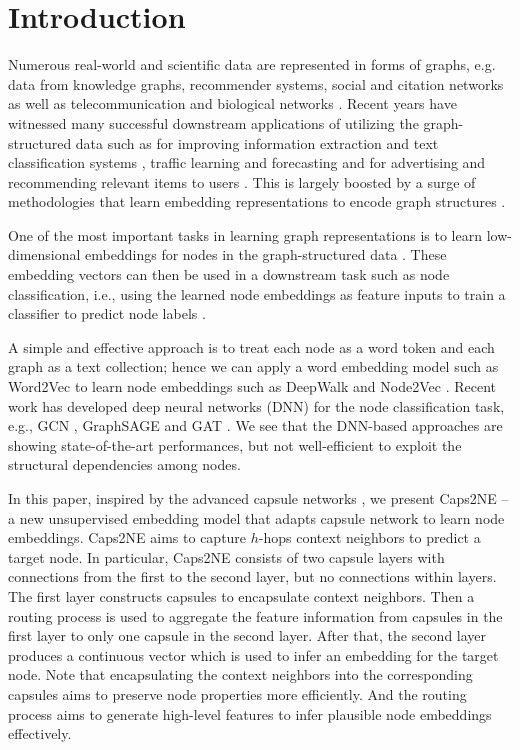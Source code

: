 \documentclass[sigconf]{acmart}
\begin{document}
\section{Introduction}
Numerous real-world and scientific data are represented in forms of graphs, e.g. data  from knowledge graphs, recommender systems,  social and citation networks as well as telecommunication and biological networks  \citep{battaglia2018relational,Chen180802590}. 
Recent years have witnessed many successful downstream applications of utilizing  the graph-structured data such as for improving information extraction and text classification systems \citep{kipf2017semi},  traffic  learning  and forecasting  \citep{Cui1802.07007} and for advertising and recommending relevant items to users \citep{Ying:2018:GCN,Wang:2018:BCE}. This is largely boosted by a  surge  of methodologies  that learn embedding representations to encode graph structures \citep{cai2018comprehensive}. 

One of the most important tasks in learning graph representations is to learn low-dimensional embeddings for nodes in the graph-structured data \citep{zhang2020network}. 
These embedding vectors can then be used in a downstream task such as node classification, i.e., using the learned node embeddings as feature inputs to train a classifier to predict node labels \citep{hamilton2017inductive}. 

A simple and effective approach is to treat each node as a word token and each graph as a text collection; hence we can apply a word embedding model such as Word2Vec \citep{MikolovSCCD13nips} to learn node embeddings such as DeepWalk \citep{Perozzi:2014} and Node2Vec \citep{Grover:2016}.
Recent work has developed deep neural networks (DNN) for the node classification task, e.g., GCN \citep{kipf2017semi}, GraphSAGE \citep{hamilton2017inductive} and GAT \citep{velickovic2018graph}.
We see that the DNN-based approaches are showing state-of-the-art performances, but not well-efficient to exploit the structural dependencies among nodes.

In this paper, inspired by the advanced capsule networks \citep{sabour2017dynamic}, we present Caps2NE -- a new unsupervised embedding model that adapts capsule network to learn node embeddings. Caps2NE aims to capture $h$-hops context neighbors to predict a target node. In particular, Caps2NE consists of two capsule layers with connections from the first to the second layer, but no connections within layers. 
The first layer constructs capsules to encapsulate context neighbors. 
Then a routing process is used to aggregate the feature information from capsules in the first layer to only one capsule in the second layer. 
After that, the second layer produces a continuous vector which is used to infer an embedding for the target node. 
Note that encapsulating the context neighbors into the corresponding capsules aims to preserve node properties more efficiently. 
And the routing process aims to generate high-level features to infer plausible node embeddings effectively. 
\end{document}
